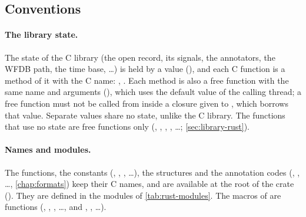 \subsection{Conventions}

\paragraph{The library state.} The state of the C library (the open record, its signals,
the annotators, the WFDB path, the time base, \ldots) is held by a  value
(), and each C function is a method of it with the C name:
, . Each method is also a free function with
the same name and arguments (), which uses the default
 value of the calling thread; a free function must not be called from inside a
closure given to , which borrows that value. Separate
 values share no state, unlike the C library. The functions that use no state
are free functions only (, , ,
, \ldots; \cref{sec:library-rust}).

\paragraph{Names and modules.} The functions, the constants (,
, , \ldots), the structures and the
annotation codes (, , \ldots, \cref{chap:formats}) keep their C
names, and are available at the root of the crate (). They are
defined in the modules of \cref{tab:rust-modules}. The macros of
 are functions (, , , \ldots,
and , , \ldots).

